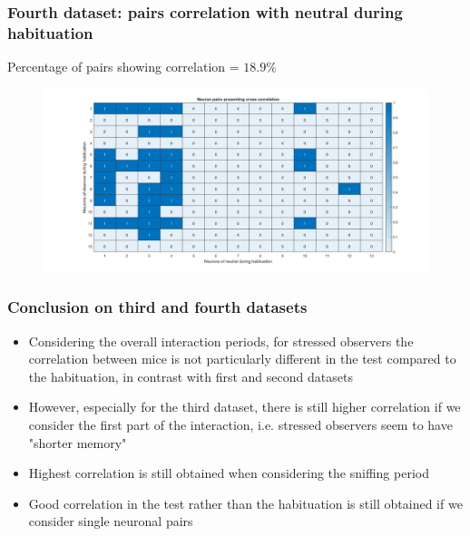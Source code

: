 \documentclass{beamer}
\begin{document}
\begin{frame}
\frametitle{Fourth dataset: pairs correlation with neutral during habituation}

Percentage of pairs showing correlation = $ 18.9\%$

\begin{figure}[H]
\begin{center}
\hspace*{-1cm}
\includegraphics[scale=.28]{neuron_corr_neut_hab4.jpg} 
\end{center}  


\end{figure}

\end{frame}



\begin{frame}
\frametitle{Conclusion on third and fourth datasets}

\begin{itemize}
	\item Considering the overall interaction periods, for stressed observers the correlation between mice is not particularly different in the test compared to the habituation, in contrast with first and second datasets
	
	\item However, especially for the third dataset, there is still  higher correlation if we consider the first part of the interaction, i.e. stressed observers seem to have "shorter memory"
	
	\item Highest correlation is still obtained when considering the sniffing period
	
	\item Good correlation in the test rather than the habituation is still obtained if we consider single neuronal pairs
\end{itemize}
\end{frame}
\end{document}
